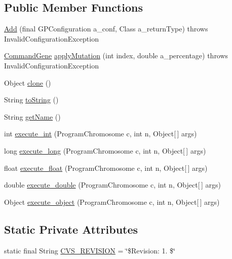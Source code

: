 \subsection*{Public Member Functions}
\begin{DoxyCompactItemize}
\item 
\hyperlink{classorg_1_1jgap_1_1gp_1_1function_1_1_add_af6af7439c7e72986a79ae133eeb68837}{Add} (final G\-P\-Configuration a\-\_\-conf, Class a\-\_\-return\-Type)  throws Invalid\-Configuration\-Exception 
\item 
\hyperlink{classorg_1_1jgap_1_1gp_1_1_command_gene}{Command\-Gene} \hyperlink{classorg_1_1jgap_1_1gp_1_1function_1_1_add_a9f4e9760301a72c2c7452452778eb236}{apply\-Mutation} (int index, double a\-\_\-percentage)  throws Invalid\-Configuration\-Exception 
\item 
Object \hyperlink{classorg_1_1jgap_1_1gp_1_1function_1_1_add_a93b314853a198284fa2b962fa3aa9806}{clone} ()
\item 
String \hyperlink{classorg_1_1jgap_1_1gp_1_1function_1_1_add_a3edf9acb61e2fcc38b3b624853960f5f}{to\-String} ()
\item 
String \hyperlink{classorg_1_1jgap_1_1gp_1_1function_1_1_add_a4c0c1e2d04e7849f50b1eb4177f4f443}{get\-Name} ()
\item 
int \hyperlink{classorg_1_1jgap_1_1gp_1_1function_1_1_add_a4e5fd3d335553589ab24ab9f83cbbcd8}{execute\-\_\-int} (Program\-Chromosome c, int n, Object\mbox{[}$\,$\mbox{]} args)
\item 
long \hyperlink{classorg_1_1jgap_1_1gp_1_1function_1_1_add_af38da5e98760afc6104829a38cbc7732}{execute\-\_\-long} (Program\-Chromosome c, int n, Object\mbox{[}$\,$\mbox{]} args)
\item 
float \hyperlink{classorg_1_1jgap_1_1gp_1_1function_1_1_add_aa91195c0430b3eacea5f0eb083f5e7f4}{execute\-\_\-float} (Program\-Chromosome c, int n, Object\mbox{[}$\,$\mbox{]} args)
\item 
double \hyperlink{classorg_1_1jgap_1_1gp_1_1function_1_1_add_ad830922e5000b6cd9c2ab3028dc2ca87}{execute\-\_\-double} (Program\-Chromosome c, int n, Object\mbox{[}$\,$\mbox{]} args)
\item 
Object \hyperlink{classorg_1_1jgap_1_1gp_1_1function_1_1_add_a4d056e95aac55f8d67b5d2b9646f2ff4}{execute\-\_\-object} (Program\-Chromosome c, int n, Object\mbox{[}$\,$\mbox{]} args)
\end{DoxyCompactItemize}
\subsection*{Static Private Attributes}
\begin{DoxyCompactItemize}
\item 
static final String \hyperlink{classorg_1_1jgap_1_1gp_1_1function_1_1_add_af211bdec40bd7f32aebf9f5436864e76}{C\-V\-S\-\_\-\-R\-E\-V\-I\-S\-I\-O\-N} = \char`\"{}\$Revision\-: 1. \$\char`\"{}
\end{DoxyCompactItemize}
